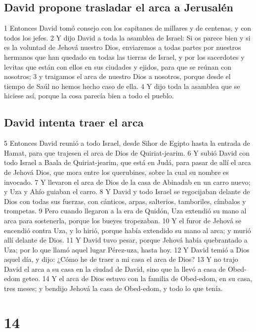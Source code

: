 \section*{David propone trasladar el arca a Jerusalén}


1 Entonces David tomó consejo con los capitanes de millares y de centenas, y con todos los jefes.
2 Y dijo David a toda la asamblea de Israel: Si os parece bien y si es la voluntad de Jehová nuestro Dios, enviaremos a todas partes por nuestros hermanos que han quedado en todas las tierras de Israel, y por los sacerdotes y levitas que están con ellos en sus ciudades y ejidos, para que se reúnan con nosotros;
3 y traigamos el arca de nuestro Dios a nosotros, porque desde el tiempo de Saúl no hemos hecho caso de ella.
4 Y dijo toda la asamblea que se hiciese así, porque la cosa parecía bien a todo el pueblo.
\section*{David intenta traer el arca}


5 Entonces David reunió a todo Israel, desde Sihor de Egipto hasta la entrada de Hamat, para que trajesen el arca de Dios de Quiriat-jearim. 
6 Y subió David con todo Israel a Baala de Quiriat-jearim, que está en Judá, para pasar de allí el arca de Jehová Dios, que mora entre los querubines, sobre la cual su nombre es invocado.
7 Y llevaron el arca de Dios de la casa de Abinadab en un carro nuevo; y Uza y Ahío guiaban el carro.
8 Y David y todo Israel se regocijaban delante de Dios con todas sus fuerzas, con cánticos, arpas, salterios, tamboriles, címbalos y trompetas.
9 Pero cuando llegaron a la era de Quidón, Uza extendió su mano al arca para sostenerla, porque los bueyes tropezaban.
10 Y el furor de Jehová se encendió contra Uza, y lo hirió, porque había extendido su mano al arca; y murió allí delante de Dios.
11 Y David tuvo pesar, porque Jehová había quebrantado a Uza; por lo que llamó aquel lugar Pérez-uza, hasta hoy.
12 Y David temió a Dios aquel día, y dijo: ¿Cómo he de traer a mi casa el arca de Dios?
13 Y no trajo David el arca a su casa en la ciudad de David, sino que la llevó a casa de Obed-edom geteo.
14 Y el arca de Dios estuvo con la familia de Obed-edom, en su casa, tres meses; y bendijo Jehová la casa de Obed-edom, y todo lo que tenía.

\chapter{14}

